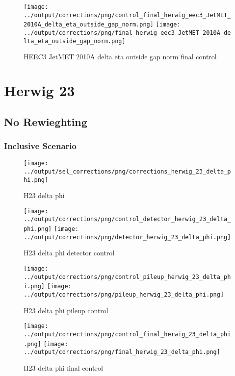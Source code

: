 \documentclass[11pt]{book}
\begin{document}
\begin{figure}[ht]
\centering
\texttt{[image: ../output/corrections/png/control\_final\_herwig\_eec3\_JetMET\_2010A\_delta\_eta\_outside\_gap\_norm.png]}
\texttt{[image: ../output/corrections/png/final\_herwig\_eec3\_JetMET\_2010A\_delta\_eta\_outside\_gap\_norm.png]}
\caption{HEEC3 JetMET 2010A delta eta outside gap norm final control}
\label{fig:HEEC3_JetMET_2010A_delta_eta_outside_gap_norm_final_control}
\end{figure}


\cleardoublepage

\chapter{Herwig 23}

\section{No Rewieghting}

\subsection{Inclusive Scenario}
\begin{figure}[ht]
\centering
\texttt{[image: ../output/sel\_corrections/png/corrections\_herwig\_23\_delta\_phi.png]}
\caption{H23 delta phi}
\label{fig:H23_delta_phi}
\end{figure}

\begin{figure}[ht]
\centering
\texttt{[image: ../output/corrections/png/control\_detector\_herwig\_23\_delta\_phi.png]}
\texttt{[image: ../output/corrections/png/detector\_herwig\_23\_delta\_phi.png]}
\caption{H23 delta phi detector control}
\label{fig:H23_delta_phi_detector_control}
\end{figure}

\begin{figure}[ht]
\centering
\texttt{[image: ../output/corrections/png/control\_pileup\_herwig\_23\_delta\_phi.png]}
\texttt{[image: ../output/corrections/png/pileup\_herwig\_23\_delta\_phi.png]}
\caption{H23 delta phi pileup control}
\label{fig:H23_delta_phi_pileup_control}
\end{figure}


\begin{figure}[ht]
\centering
\texttt{[image: ../output/corrections/png/control\_final\_herwig\_23\_delta\_phi.png]}
\texttt{[image: ../output/corrections/png/final\_herwig\_23\_delta\_phi.png]}
\caption{H23 delta phi final control}
\label{fig:H23_delta_phi_final_control}
\end{figure}
\end{document}
